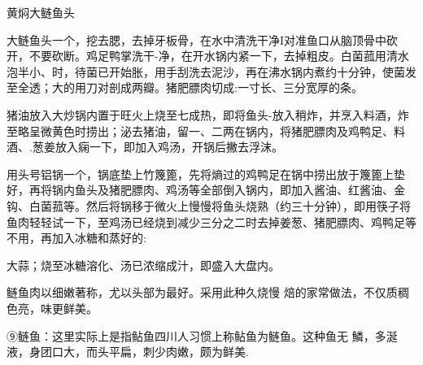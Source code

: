 \begin{recipe}{黄焖大鲢鱼头}

\ingredients









\cooking

\step 大鲢鱼头一个，挖去腮，去掉牙板骨，在水中清洗干净I对准鱼口从脑顶骨中砍开，不要砍断。鸡足鸭掌洗干-净，在开水锅内紧一下，去掉粗皮。白菌菰用清水泡半小、时，待菌已开始胀，用手刮洗去泥沙，再在沸水锅内煮约十分钟，使菌发至全透；大的用刀对剖成两瓣。猪肥膘肉切成:一寸长、三分宽厚的条。

\step 猪油放入大炒锅内置于旺火上烧至七成热，即将鱼头-放入稍炸，并烹入料酒，炸至略呈微黄色时捞出；泌去猪油，留一、二两在锅内，将猪肥膘肉及鸡鸭足、料酒、.葱姜放入痫一下，即加入鸡汤，开锅后撇去浮沫。

\step 用头号铝锅一个，锅底垫上竹篾篦，先将熵过的鸡鸭足在锅中捞出放于篾篦上垫好，再将锅内鱼头及猪肥膘肉、鸡汤等全部倒入锅内，即加入酱油、红酱油、金钩、白菌菰等。然后将锅移于微火上慢慢将鱼头烧熟（约三十分钟），即用筷子将鱼肉轻轻试一下，至鸡汤已经烧到减少三分之二时去掉姜葱、猪肥膘肉、鸡鸭足等不用，再加入冰糖和蒸好的:

大蒜；烧至冰糖溶化、汤已浓缩成汁，即盛入大盘内。

\notes

鲢鱼肉以细嫩著称，尤以头部为最好。采用此种久烧慢 焙的家常做法，不仅质稠色亮，味更鲜美。

⑨鲢鱼：这里实际上是指鲇鱼四川人习惯上称鲇鱼为鲢鱼。这种鱼无 鱗，多涎液，身团口大，而头平扁，刺少肉嫩，颇为鲜美.

\end{recipe}

